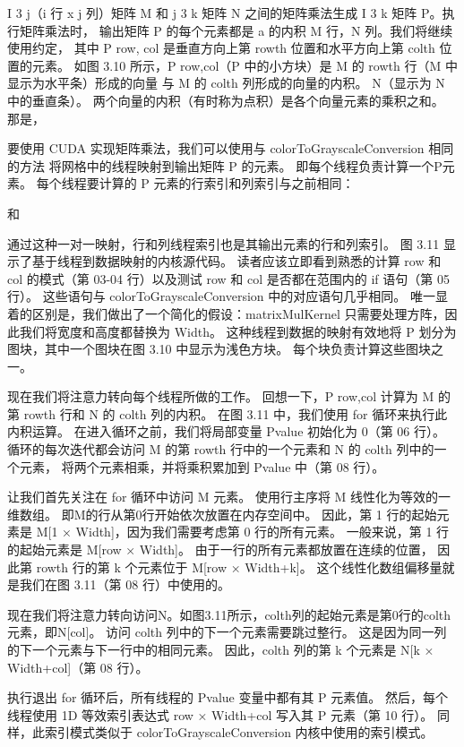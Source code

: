 I 3 j（i 行 x j 列）矩阵 M 和 j 3 k 矩阵 N 之间的矩阵乘法生成 I 3 k 矩阵 P。执行矩阵乘法时，
输出矩阵 P 的每个元素都是 a 的内积 M 行，N 列。我们将继续使用约定，
其中 P row, col 是垂直方向上第 rowth 位置和水平方向上第 colth 位置的元素。 
如图 3.10 所示，P row,col（P 中的小方块）是 M 的 rowth 行（M 中显示为水平条）形成的向量
与 M 的 colth 列形成的向量的内积。 N（显示为 N 中的垂直条）。 
两个向量的内积（有时称为点积）是各个向量元素的乘积之和。 那是，

要使用 CUDA 实现矩阵乘法，我们可以使用与 colorToGrayscaleConversion 相同的方法
将网格中的线程映射到输出矩阵 P 的元素。 即每个线程负责计算一个P元素。 
每个线程要计算的 P 元素的行索引和列索引与之前相同：

和

通过这种一对一映射，行和列线程索引也是其输出元素的行和列索引。 图 3.11 显示了基于线程到数据映射的内核源代码。 
读者应该立即看到熟悉的计算 row 和 col 的模式（第 03-04 行）以及测试 row 和 col 是否都在范围内的 if 语句（第 05 行）。 
这些语句与 colorToGrayscaleConversion 中的对应语句几乎相同。 
唯一显着的区别是，我们做出了一个简化的假设：matrixMulKernel 只需要处理方阵，因此我们将宽度和高度都替换为 Width。 
这种线程到数据的映射有效地将 P 划分为图块，其中一个图块在图 3.10 中显示为浅色方块。 每个块负责计算这些图块之一。

现在我们将注意力转向每个线程所做的工作。 回想一下，P row,col 计算为 M 的第 rowth 行和 N 的 colth 列的内积。
在图 3.11 中，我们使用 for 循环来执行此内积运算。 在进入循环之前，我们将局部变量 Pvalue 初始化为 0（第 06 行）。 
循环的每次迭代都会访问 M 的第 rowth 行中的一个元素和 N 的 colth 列中的一个元素，
将两个元素相乘，并将乘积累加到 Pvalue 中（第 08 行）。

让我们首先关注在 for 循环中访问 M 元素。 使用行主序将 M 线性化为等效的一维数组。 
即M的行从第0行开始依次放置在内存空间中。 因此，第 1 行的起始元素是 M[1 × Width]，因为我们需要考虑第 0 行的所有元素。
一般来说，第 1 行的起始元素是 M[row × Width]。 由于一行的所有元素都放置在连续的位置，
因此第 rowth 行的第 k 个元素位于 M[row × Width+k]。 这个线性化数组偏移量就是我们在图 3.11（第 08 行）中使用的。

现在我们将注意力转向访问N。如图3.11所示，colth列的起始元素是第0行的colth元素，即N[col]。 
访问 colth 列中的下一个元素需要跳过整行。 这是因为同一列的下一个元素与下一行中的相同元素。 
因此，colth 列的第 k 个元素是 N[k × Width+col]（第 08 行）。

执行退出 for 循环后，所有线程的 Pvalue 变量中都有其 P 元素值。 
然后，每个线程使用 1D 等效索引表达式 row × Width+col 写入其 P 元素（第 10 行）。 
同样，此索引模式类似于 colorToGrayscaleConversion 内核中使用的索引模式。


